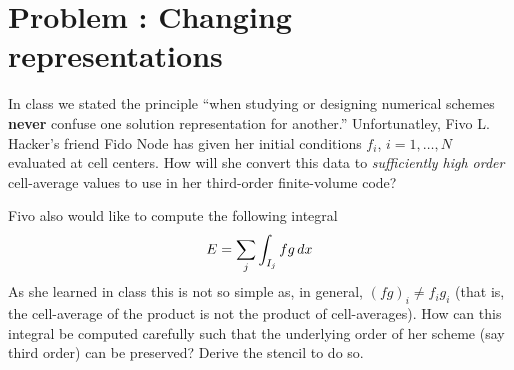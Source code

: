 \documentclass[11pt]{article}
\newcounter{probnum}
\begin{document}
\section*{Problem : Changing representations}

In class we stated the principle ``when studying or designing
numerical schemes {\bf never} confuse one solution representation for
another.'' Unfortunatley, Fivo L. Hacker's friend Fido Node has given
her initial conditions $f_i$, $i=1,\ldots,N$ evaluated at cell
centers. How will she convert this data to \emph{sufficiently high
  order} cell-average values to use in her third-order finite-volume
code?

Fivo also would like to compute the following integral
\begin{align*}
  E = \sum_j \int_{I_j} f g \thinspace dx
\end{align*}
As she learned in class this is not so simple as, in general,
$(f g)_i \neq f_i g_i$ (that is, the cell-average of the product is
not the product of cell-averages). How can this integral be computed
carefully such that the underlying order of her scheme (say third
order) can be preserved? Derive the stencil to do so.
\end{document}

